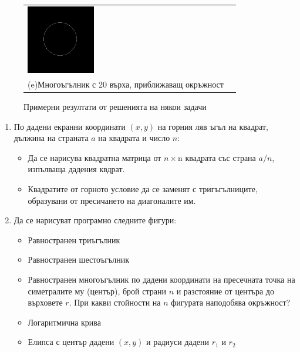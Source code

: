 \documentclass[12pt,a4paper]{article}
\begin{document}
{\begin{figure}
\begin{center}
\begin{tabular}{|p{5.2cm}p{5.2cm}|}
   \vspace{10pt}
   \includegraphics[width=3cm]{images/graph_twentygon}   &
    \\
    (e)Многоъгълник с 20 върха, приближаващ окръжност
   \vspace{10pt} &
   \\\hline
  \end{tabular}
  \end{center}

  \caption{Примерни резултати от решенията на някои задачи}
  \label{fig:drawings}
\end{figure}



\begin{enumerate}[resume]


	\item По дадени екранни координати $(x,y)$ на горния ляв ъгъл на квадрат, дължина на страната $a$ на квадрата и число $n$:

	\begin{itemize}
		\item Да се нарисува квадратна матрица от $n \times $n квадрата със страна $a/n$, изпълваща дадения квдрат.
		\item Квадратите от горното условие да се заменят с тригъгълниците, образувани от пресичането на диагоналите им.
	\end{itemize}

	\item Да се нарисуват програмно следните фигури:

	\begin{itemize}
		\item Равностранен триъгълник
		\item Равностранен шестоъгълник
		\item Равностранен многоъгълник по дадени координати на пресечната точка на симетралите му (център), брой страни $n$ и разстояние от центъра до върховете $r$. При какви стойности на $n$ фигурата наподобява окръжност?
		\item Логаритмична крива
		\item Елипса с център дадени $(x,y)$ и радиуси дадени $r_1$ и $r_2$
	\end{itemize}


\end{enumerate}}
\end{document}
